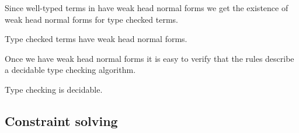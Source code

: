 Since well-typed terms in {\Core} have weak head normal forms we get the
existence of weak head normal forms for type checked terms.

\begin{corollary}
    Type checked terms have weak head normal forms.
\end{corollary}

Once we have weak head normal forms it is easy to verify that the rules
describe a decidable type checking algorithm.

\begin{corollary}
    Type checking is decidable.
\end{corollary}

\subsection{Constraint solving}

